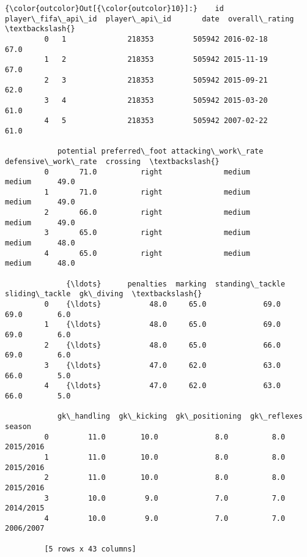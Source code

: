 \documentclass[11pt]{article}
\begin{document}
\begin{Verbatim}[commandchars=\\\{\}]
{\color{outcolor}Out[{\color{outcolor}10}]:}    id  player\_fifa\_api\_id  player\_api\_id       date  overall\_rating  \textbackslash{}
         0   1              218353         505942 2016-02-18            67.0   
         1   2              218353         505942 2015-11-19            67.0   
         2   3              218353         505942 2015-09-21            62.0   
         3   4              218353         505942 2015-03-20            61.0   
         4   5              218353         505942 2007-02-22            61.0   
         
            potential preferred\_foot attacking\_work\_rate defensive\_work\_rate  crossing  \textbackslash{}
         0       71.0          right              medium              medium      49.0   
         1       71.0          right              medium              medium      49.0   
         2       66.0          right              medium              medium      49.0   
         3       65.0          right              medium              medium      48.0   
         4       65.0          right              medium              medium      48.0   
         
              {\ldots}      penalties  marking  standing\_tackle  sliding\_tackle  gk\_diving  \textbackslash{}
         0    {\ldots}           48.0     65.0             69.0            69.0        6.0   
         1    {\ldots}           48.0     65.0             69.0            69.0        6.0   
         2    {\ldots}           48.0     65.0             66.0            69.0        6.0   
         3    {\ldots}           47.0     62.0             63.0            66.0        5.0   
         4    {\ldots}           47.0     62.0             63.0            66.0        5.0   
         
            gk\_handling  gk\_kicking  gk\_positioning  gk\_reflexes     season  
         0         11.0        10.0             8.0          8.0  2015/2016  
         1         11.0        10.0             8.0          8.0  2015/2016  
         2         11.0        10.0             8.0          8.0  2015/2016  
         3         10.0         9.0             7.0          7.0  2014/2015  
         4         10.0         9.0             7.0          7.0  2006/2007  
         
         [5 rows x 43 columns]
\end{Verbatim}
            
\end{document}
